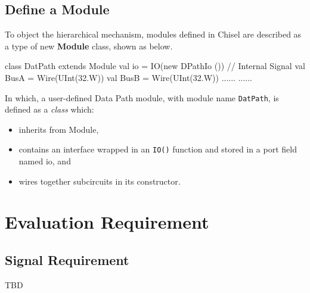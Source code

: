 \documentclass[a4paper]{article}
\def\code#1{{\tt #1}}
\begin{document}
\subsection{Define a Module} \label{sub:module}
To object the hierarchical mechanism, modules defined in Chisel are described as a type of new \textbf{Module} class, shown as below.
\begin{scala}
class DatPath extends Module {
	val io = IO(new DPathIo ())
	// Internal Signal
	val BusA 	= Wire(UInt(32.W))
	val BusB 	= Wire(UInt(32.W))
	......
	......
}
\end{scala}
In which, a user-defined Data Path module, with module name \code{DatPath}, is defined as a \textit{class} which:
\begin{itemize}
	\item inherits from Module,
	\item contains an interface wrapped in an \code{IO()} function and stored in a port field named io, and
	\item wires together subcircuits in its constructor.
\end{itemize}


\newpage
\section{Evaluation Requirement} \label{sec:Functions}%
\subsection{Signal Requirement}\label{sub:signal}
TBD
\end{document}
